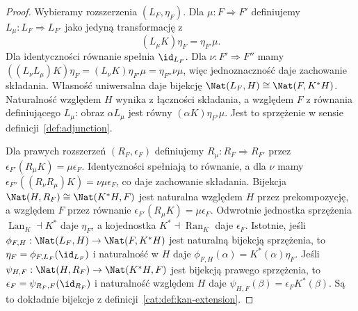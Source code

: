 \begin{proof}
Wybieramy rozszerzenia $(L_F,\eta_F)$. Dla $\mu:F\Rightarrow F'$ definiujemy $L_\mu:L_F\Rightarrow L_{F'}$ jako jedyną transformację z
\[
 (L_\mu K)\eta_F=\eta_{F'}\mu.
\]
Dla identyczności równanie spełnia $\id_{L_F}$. Dla $\nu:F'\Rightarrow F''$ mamy $((L_\nu L_\mu)K)\eta_F=(L_\nu K)\eta_{F'}\mu=\eta_{F''}\nu\mu$, więc jednoznaczność daje zachowanie składania. Własność uniwersalna daje bijekcję $\Nat(L_F,H)\cong\Nat(F,K^*H)$. Naturalność względem $H$ wynika z łączności składania, a względem $F$ z równania definiującego $L_\mu$: obraz $\alpha L_\mu$ jest równy $(\alpha K)\eta_{F'}\mu$. Jest to sprzężenie w sensie definicji~\ref{def:adjunction}.

Dla prawych rozszerzeń $(R_F,\epsilon_F)$ definiujemy $R_\mu:R_F\Rightarrow R_{F'}$ przez $\epsilon_{F'}(R_\mu K)=\mu\epsilon_F$. Identyczności spełniają to równanie, a dla $\nu$ mamy $\epsilon_{F''}((R_\nu R_\mu)K)=\nu\mu\epsilon_F$, co daje zachowanie składania. Bijekcja $\Nat(H,R_F)\cong\Nat(K^*H,F)$ jest naturalna względem $H$ przez prekompozycję, a względem $F$ przez równanie $\epsilon_{F'}(R_\mu K)=\mu\epsilon_F$. Odwrotnie jednostka sprzężenia $\operatorname{Lan}_K\dashv K^*$ daje $\eta_F$, a kojednostka $K^*\dashv\operatorname{Ran}_K$ daje $\epsilon_F$. Istotnie, jeśli $\phi_{F,H}:\Nat(L_F,H)\to\Nat(F,K^*H)$ jest naturalną bijekcją sprzężenia, to $\eta_F=\phi_{F,L_F}(\id_{L_F})$ i naturalność w $H$ daje $\phi_{F,H}(\alpha)=K^*(\alpha)\eta_F$. Jeśli $\psi_{H,F}:\Nat(H,R_F)\to\Nat(K^*H,F)$ jest bijekcją prawego sprzężenia, to $\epsilon_F=\psi_{R_F,F}(\id_{R_F})$ i naturalność względem $H$ daje $\psi_{H,F}(\beta)=\epsilon_F K^*(\beta)$. Są to dokładnie bijekcje z definicji~\ref{cat:def:kan-extension}.
\end{proof}

